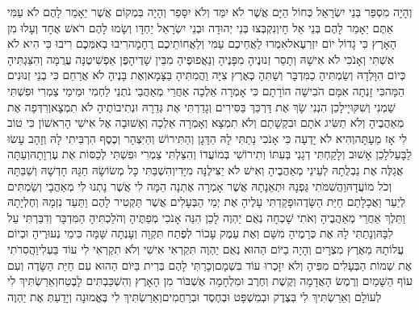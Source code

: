 \documentclass[../main/main.tex]{subfiles}
\begin{document}
\begin{multicols}{\ncols}
וְהָיָה מִסְפַּר בְּנֵי יִשְׂרָאֵל כְּחוֹל הַיָּם אֲשֶׁר לֹא יִמַּד וְלֹא יִסָּפֵר וְהָיָה בִּמְקוֹם אֲשֶׁר יֵאָמֵר לָהֶם לֹא עַמִּי אַתֶּם יֵאָמֵר לָהֶם בְּנֵי אֵל חָי\PreVerseSpace{}וְנִקְבְּצוּ בְּנֵי יְהוּדָה וּבְנֵי יִשְׂרָאֵל יַחְדָּו וְשָׂמוּ לָהֶם רֹאשׁ אֶחָד וְעָלוּ מִן הָאָרֶץ כִּי גָדוֹל יוֹם יִזְרְעֶאל\PreVerseSpace{}אִמְרוּ לַאֲחֵיכֶם עַמִּי וְלַאֲחוֹתֵיכֶם רֻחָמָה\PreVerseSpace{}רִיבוּ בְאִמְּכֶם רִיבוּ כִּי הִיא לֹא אִשְׁתִּי וְאָנֹכִי לֹא אִישָׁהּ וְתָסֵר זְנוּנֶיהָ מִפָּנֶיהָ וְנַאֲפוּפֶיהָ מִבֵּין שָׁדֶיהָ\PreVerseSpace{}פֶּן אַפְשִׁיטֶנָּה עֲרֻמָּה וְהִצַּגְתִּיהָ כְּיוֹם הִוָּלְדָהּ וְשַׂמְתִּיהָ כַמִּדְבָּר וְשַׁתִּהָ כְּאֶרֶץ צִיָּה וַהֲמִתִּיהָ בַּצָּמָא\PreVerseSpace{}וְאֶת בָּנֶיהָ לֹא אֲרַחֵם כִּי בְנֵי זְנוּנִים הֵמָּה\PreVerseSpace{}כִּי זָנְתָה אִמָּם הֹבִישָׁה הוֹרָתָם כִּי אָמְרָה אֵלְכָה אַחֲרֵי מְאַהֲבַי נֹתְנֵי לַחְמִי וּמֵימַי צַמְרִי וּפִשְׁתִּי שַׁמְנִי וְשִׁקּוּיָי\PreVerseSpace{}לָכֵן הִנְנִי שָׂךְ אֶת דַּרְכֵּךְ בַּסִּירִים וְגָדַרְתִּי אֶת גְּדֵרָהּ וּנְתִיבוֹתֶיהָ לֹא תִמְצָא\PreVerseSpace{}וְרִדְּפָה אֶת מְאַהֲבֶיהָ וְלֹא תַשִּׂיג אֹתָם וּבִקְשָׁתַם וְלֹא תִמְצָא וְאָמְרָה אֵלְכָה וְאָשׁוּבָה אֶל אִישִׁי הָרִאשׁוֹן כִּי טוֹב לִי אָז מֵעָתָּה\PreVerseSpace{}וְהִיא לֹא יָדְעָה כִּי אָנֹכִי נָתַתִּי לָהּ הַדָּגָן וְהַתִּירוֹשׁ וְהַיִּצְהָר וְכֶסֶף הִרְבֵּיתִי לָהּ וְזָהָב עָשׂוּ לַבָּעַל\PreVerseSpace{}לָכֵן אָשׁוּב וְלָקַחְתִּי דְגָנִי בְּעִתּוֹ וְתִירוֹשִׁי בְּמוֹעֲדוֹ וְהִצַּלְתִּי צַמְרִי וּפִשְׁתִּי לְכַסּוֹת אֶת עֶרְוָתָהּ\PreVerseSpace{}וְעַתָּה אֲגַלֶּה אֶת נַבְלֻתָהּ לְעֵינֵי מְאַהֲבֶיהָ וְאִישׁ לֹא יַצִּילֶנָּה מִיָּדִי\PreVerseSpace{}וְהִשְׁבַּתִּי כָּל מְשׂוֹשָׂהּ חַגָּהּ חָדְשָׁהּ וְשַׁבַּתָּהּ וְכֹל מוֹעֲדָהּ\PreVerseSpace{}וַהֲשִׁמֹּתִי גַּפְנָהּ וּתְאֵנָתָהּ אֲשֶׁר אָמְרָה אֶתְנָה הֵמָּה לִי אֲשֶׁר נָתְנוּ לִי מְאַהֲבָי וְשַׂמְתִּים לְיַעַר וַאֲכָלָתַם חַיַּת הַשָּׂדֶה\PreVerseSpace{}וּפָקַדְתִּי עָלֶיהָ אֶת יְמֵי הַבְּעָלִים אֲשֶׁר תַּקְטִיר לָהֶם וַתַּעַד נִזְמָהּ וְחֶלְיָתָהּ וַתֵּלֶךְ אַחֲרֵי מְאַהֲבֶיהָ וְאֹתִי שָׁכְחָה נְאֻם יַהְוֶה \ClosedSection{}לָכֵן הִנֵּה אָנֹכִי מְפַתֶּיהָ וְהֹלַכְתִּיהָ הַמִּדְבָּר וְדִבַּרְתִּי עַל לִבָּהּ\PreVerseSpace{}וְנָתַתִּי לָהּ אֶת כְּרָמֶיהָ מִשָּׁם וְאֶת עֵמֶק עָכוֹר לְפֶתַח תִּקְוָה וְעָנְתָה שָּׁמָּה כִּימֵי נְעוּרֶיהָ וּכְיוֹם עֲלוֹתָהּ מֵאֶרֶץ מִצְרָיִם \ClosedSection{}וְהָיָה בַיּוֹם הַהוּא נְאֻם יַהְוֶה תִּקְרְאִי אִישִׁי וְלֹא תִקְרְאִי לִי עוֹד בַּעְלִי\PreVerseSpace{}וַהֲסִרֹתִי אֶת שְׁמוֹת הַבְּעָלִים מִפִּיהָ וְלֹא יִזָּכְרוּ עוֹד בִּשְׁמָם\PreVerseSpace{}וְכָרַתִּי לָהֶם בְּרִית בַּיּוֹם הַהוּא עִם חַיַּת הַשָּׂדֶה וְעִם עוֹף הַשָּׁמַיִם וְרֶמֶשׂ הָאֲדָמָה וְקֶשֶׁת וְחֶרֶב וּמִלְחָמָה אֶשְׁבּוֹר מִן הָאָרֶץ וְהִשְׁכַּבְתִּים לָבֶטַח\PreVerseSpace{}וְאֵרַשְׂתִּיךְ לִי לְעוֹלָם וְאֵרַשְׂתִּיךְ לִי בְּצֶדֶק וּבְמִשְׁפָּט וּבְחֶסֶד וּבְרַחֲמִים\PreVerseSpace{}וְאֵרַשְׂתִּיךְ לִי בֶּאֱמוּנָה וְיָדַעַתְּ אֶת יַהְוֶה\OpenSection{}\par

\end{multicols}
\end{document}
